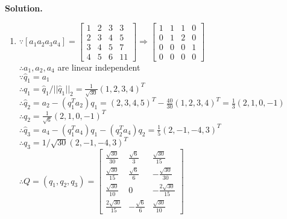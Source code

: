 \documentclass[english,onecolumn]{IEEEtran}
\begin{document}
\noindent
\textbf{Solution.}
\begin{enumerate}
    \item
    $\because [a_1  a_2  a_3  a_4]  = 
    \begin{bmatrix}
    1 & 2 & 3 & 3\\
    2 & 3 & 4 & 5\\
    3 & 4 & 5 & 7\\
    4 & 5 & 6 & 11
    \end{bmatrix}
    \Rightarrow
    \begin{bmatrix}
    1 & 1 & 1 & 0\\
    0 & 1 & 2 & 0\\
    0 & 0 & 0 & 1\\
    0 & 0 & 0 & 0
    \end{bmatrix}$\\
    $\therefore a_1,a_2,a_4$ are linear independent\\
    



    $\because {\hat{q}_1} = {a_1}$\\
    $\therefore {q_1} = {\hat{q}_1 / ||\hat{q}_1 ||_2} = \frac{1}{\sqrt{30}} (1,2,3,4)^T$\\
    $\therefore{\hat{q}_2} = {a_2} - ({q^T_1 a_2})q_1 = (2,3,4,5)^T- \frac{40}{30} (1,2,3,4)^T =\frac{1}{3} (2,1,0,-1)$\\
    $\therefore {q_2} =\frac{1}{\sqrt{6}} (2,1,0,-1)^T$\\
    $\therefore {\hat{q}_3} = {a_4} - ({q^T_1 a_4})q_1 -({q^T_2 a_4})q_2=\frac{1}{5}(2,-1,-4,3)^T$\\
    $\therefore {q_3} = 1/\sqrt{30} (2,-1,-4,3)^T$\\
    $\therefore {Q} = ({q_1,q_2,q_3}) = 
    \begin{bmatrix}
    \frac{\sqrt{30}}{30} & \frac{\sqrt{6}}{3} & \frac{\sqrt{30}}{15}\\
    \frac{\sqrt{30}}{15} & \frac{\sqrt{6}}{6} & -\frac{\sqrt{30}}{30}\\
    \frac{\sqrt{30}}{10} & 0 & -\frac{2\sqrt{30}}{15}\\
    \frac{2\sqrt{30}}{15} & -\frac{\sqrt{6}}{6} & \frac{\sqrt{30}}{10}\
    \end{bmatrix}
    $\\
    

\end{enumerate}
\end{document}
